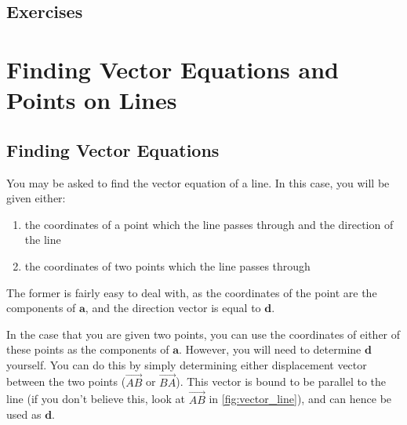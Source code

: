 \documentclass[
	11pt, %
	fleqn, %
	a4paper, %
]{../../styles/LegrandOrangeBook}
\begin{document}

%

\subsection{Exercises}

\newpage
\section{Finding Vector Equations and Points on Lines}

\subsection{Finding Vector Equations}

You may be asked to find the vector equation of a line. In this case, you will be given either:
\begin{enumerate}[label=(\alph*)]
	\item the coordinates of a point which the line passes through and the direction of the line
	\item the coordinates of two points which the line passes through
\end{enumerate}

The former is fairly easy to deal with, as the coordinates of the point are the components of $\mathbf{a}$, and the direction vector is equal to $\mathbf{d}$.

In the case that you are given two points, you can use the coordinates of either of these points as the components of $\mathbf{a}$. However, you will need to determine $\mathbf{d}$ yourself. You can do this by simply determining either displacement vector between the two points ($\overrightarrow{AB}$ or $\overrightarrow{BA}$). This vector is bound to be parallel to the line (if you don't believe this, look at $\overrightarrow{AB}$ in \autoref{fig:vector_line}), and can hence be used as $\mathbf{d}$.
\end{document}
